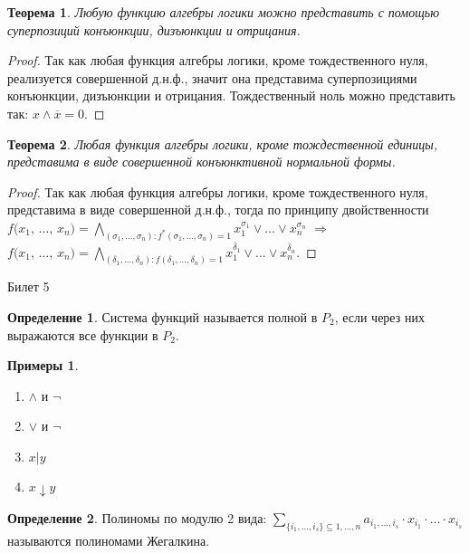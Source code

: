 \documentclass[a4paper, 12pt]{article}
\theoremstyle{definition}
\newtheorem*{definition}{Определение}
\newtheorem*{example}{Примеры}
\theoremstyle{plain}
\newtheorem*{theorem}{Теорема}
\theoremstyle{remark}
\begin{document}
  \begin{theorem}
    Любую функцию алгебры логики можно представить с помощью суперпозиций конъюнкции, дизъюнкции и отрицания.
  \end{theorem}
  \begin{proof}
    Так как любая функция алгебры логики, кроме тождественного нуля, реализуется совершенной д.н.ф., значит она представима суперпозициями конъюнкции, дизъюнкции и отрицания. Тождественный ноль можно представить так: $x\wedge\overline{x}=0$.
  \end{proof}
  \begin{theorem}
    Любая функция алгебры логики, кроме тождественной единицы, представима в виде совершенной конъюнктивной нормальной формы.
  \end{theorem}
  \begin{proof}
    Так как любая функция алгебры логики, кроме тождественного нуля, представима в виде совершенной д.н.ф., тогда по принципу двойственности\\
    $f(x_1$, $\ldots$, $x_n)=\bigwedge\limits_{(\sigma_1, \ldots,\sigma_n):f^*(\sigma_1, \ldots,\sigma_n)=1}x_1^{\sigma_1}\vee\ldots\vee x_n^{\sigma_n}$ $\Longrightarrow$\\
    $f(x_1$, $\ldots$, $x_n)=\bigwedge\limits_{(\delta_1, \ldots,\delta_n):f(\delta_1, \ldots,\delta_n)=1}x_1^{\overline{\delta}_1}\vee\ldots\vee x_n^{\overline{\delta}_n}$.
  \end{proof}
  \begin{center}
    Билет 5
  \end{center}
  \begin{definition}
    Система функций называется полной в $P_2$, если через них выражаются все функции в $P_2$.
  \end{definition}
  \begin{example}
    \begin{enumerate}
      \item $\wedge$ и $\neg$
      \item $\vee$ и $\neg$
      \item $x|y$
      \item $x\downarrow y$
    \end{enumerate}
  \end{example}
  \begin{definition}
    Полиномы по модулю 2 вида: $\sum\limits_{\{i_1,\dots,i_s\}\subseteq{1,\ldots,n}}a_{i_1,\ldots,i_s}\cdot x_{i_1}\cdot\ldots\cdot x_{i_s}$ называются полиномами Жегалкина.
  \end{definition}
\end{document}
